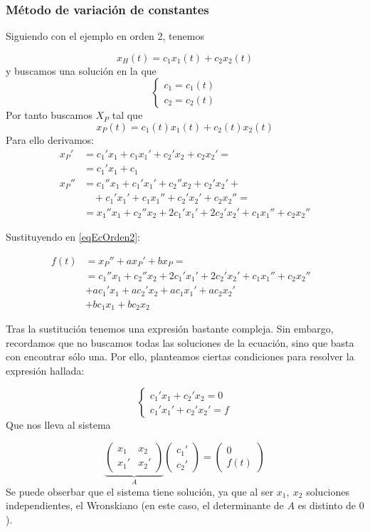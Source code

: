 \documentclass{mathnotes}
\begin{document}
\subsubsection{Método de variación de constantes}
\label{secMetodoVarConst}

Siguiendo con el ejemplo en orden 2, tenemos 

\[ x_H (t) = c_1x_1(t) + c_2x_2(t) \]
y buscamos una solución en la que
$$
\left\lbrace
\begin{array}{l}
c_1 = c_1(t)\\
c_2 = c_2(t)
\end{array}
\right. 
$$
Por tanto buscamos $X_P$ tal que
\[ x_P(t) = c_1(t)x_1(t) + c_2(t)x_2(t) \] Para ello derivamos:
\begin{align*}
x_P'&= c_1'x_1 + c_1x_1' + c_2'x_2 + c_2x_2' = \\
	&= c_1'x_1 + c_1 \\
x_P'' 	&= c_1''x_1+c_1'x_1' + c_2''x_2+c_2'x_2' + \\ 
		&\quad+ c_1'x_1'+c_1x_1'' + c_2'x_2' + c_2x_2'' = \\
		&= x_1''x_1 + c_2''x_2+2c_1'x_1'+2c_2'x_2' + c_1x_1'' +c_2x_2'' 
\end{align*}

Sustituyendo en \eqref{eqEcOrden2}:

\begin{align*}
f(t) &= x_P'' + ax_P' + bx_P = &  \\
	&= c_1''x_1 + c_2''x_2 + 2c_1'x_1' + 2c_2'x_2'  + c_1x_1''  + c_2x_2'' \\
	& + ac_1' x_1 + ac_2'x_2  + ac_1x_1'  + ac_2x_2' \\
	&  + bc_1x_1  + bc_2x_2 
\end{align*}

Tras la sustitución tenemos una expresión bastante compleja. Sin embargo, recordamos que no buscamos todas las soluciones de la ecuación, sino que basta con encontrar sólo una. Por ello, planteamos ciertas condiciones para resolver la expresión hallada:

$$ \left\lbrace \begin{array}{l}
c_1'x_1 + c_2'x_2 = 0 \\  
c_1'x_1' + c_2'x_2' = f
\end{array} \right. $$
Que nos lleva al sistema

\[ \underbrace{\begin{pmatrix}
x_1 & x_2 \\
x_1' & x_2' 
\end{pmatrix}}_A\begin{pmatrix}
c_1' \\ c_2'
\end{pmatrix} = \begin{pmatrix}
0 \\ f(t)
\end{pmatrix} \] 
Se puede obserbar que el sistema tiene solución, ya que al ser $x_1,\ x_2$ soluciones independientes, el Wronskiano (en este caso, el determinante de $A$ es distinto de $0$).
\end{document}
